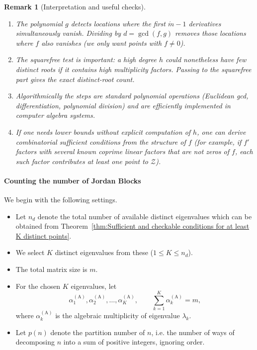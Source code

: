 \documentclass[11pt]{article}
\newtheorem{remark}{Remark}
\begin{document}
\begin{remark}[Interpretation and useful checks]
\begin{enumerate}
  \item The polynomial \(g\) detects locations where the first \(\acute{m}-1\) derivatives simultaneously vanish. Dividing by \(d=\gcd(f,g)\) removes those locations where \(f\) also vanishes (we only want points with \(f\neq0\)).
  \item The squarefree test is important: a high degree \(h\) could nonetheless have few \emph{distinct} roots if it contains high multiplicity factors. Passing to the squarefree part gives the exact distinct-root count.
  \item Algorithmically the steps are standard polynomial operations (Euclidean gcd, differentiation, polynomial division) and are efficiently implemented in computer algebra systems.
  \item If one needs lower bounds without explicit computation of \(h\), one can derive combinatorial sufficient conditions from the structure of \(f\) (for example, if \(f'\) factors with several known coprime linear factors that are not zeros of \(f\), each such factor contributes at least one point to \(\mathcal{Z}\)).
\end{enumerate}
\end{remark}


\paragraph{Counting the number of Jordan Blocks}

We begin with the following settings.
%
\begin{itemize}
  \item Let \(n_d\) denote the total number of available distinct eigenvalues which can be obtained from Theorem~\ref{thm:Sufficient and checkable conditions for at least K distinct points}.
  \item We select \(K\) distinct eigenvalues from these (\(1 \leq K \leq n_d\)).
  \item The total matrix size is \(m\).
  \item For the chosen \(K\) eigenvalues, let
  \[
  \alpha_{1}^{(\mathrm{A})}, \alpha_{2}^{(\mathrm{A})}, \dots, \alpha_{K}^{(\mathrm{A})},
  \qquad 
  \sum_{k=1}^K \alpha_{k}^{(\mathrm{A})} = m,
  \]
  where \(\alpha_{k}^{(\mathrm{A})}\) is the algebraic multiplicity of eigenvalue \(\lambda_k\).
  \item Let \(p(n)\) denote the partition number of \(n\), i.e. the number of ways of decomposing \(n\) into a sum of positive integers, ignoring order.
\end{itemize}
\end{document}
